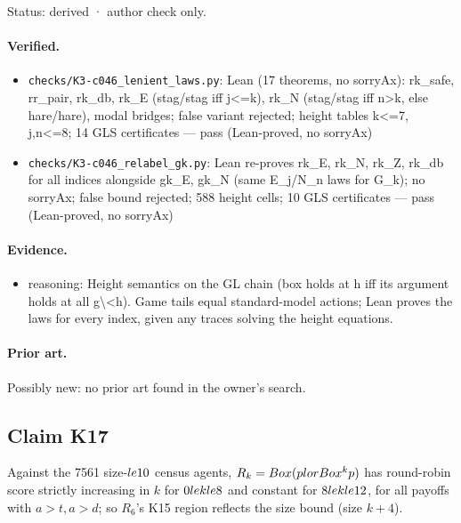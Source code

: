 \documentclass{article}
\begin{document}
Status: derived · author check only.

\paragraph{Verified.}
\begin{itemize}
\item \texttt{checks/K3-c046\_lenient\_laws.py}: Lean (17 theorems, no sorryAx): rk\_safe, rr\_pair, rk\_db, rk\_E (stag/stag iff j\textless{}=k), rk\_N (stag/stag iff n\textgreater{}k, else hare/hare), modal bridges; false variant rejected; height tables k\textless{}=7, j,n\textless{}=8; 14 GLS certificates --- pass (Lean-proved, no sorryAx)
\item \texttt{checks/K3-c046\_relabel\_gk.py}: Lean re-proves rk\_E, rk\_N, rk\_Z, rk\_db for all indices alongside gk\_E, gk\_N (same E\_j/N\_n laws for G\_k); no sorryAx; false bound rejected; 588 height cells; 10 GLS certificates --- pass (Lean-proved, no sorryAx)
\end{itemize}

\paragraph{Evidence.}
\begin{itemize}
\item reasoning: Height semantics on the GL chain (box holds at h iff its argument holds at all g\textbackslash{}\textless{}h). Game tails equal standard-model actions; Lean proves the laws for every index, given any traces solving the height equations.
\end{itemize}

\paragraph{Prior art.} Possibly new: no prior art found in the owner's search.

\subsection*{Claim K17}

Against the 7561 size-$\\le10$ census agents, $R_k=\\Box(p\\lor\\Box^kp)$ has round-robin score strictly increasing in $k$ for $0\\le k\\le8$ and constant for $8\\le k\\le12$, for all payoffs with $a>t,a>d$; so $R_6$'s K15 region reflects the size bound (size $k+4$).
\end{document}

